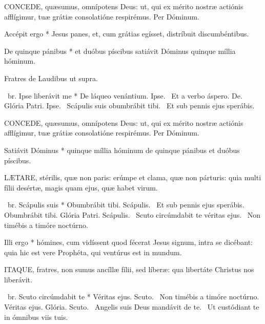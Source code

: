 
\lettrine[lines=2]{C}{ONCEDE}, quæsumus, omnípotens Deus: ut, qui ex mérito nostræ actiónis afflígimur, tuæ grátiæ consolatióne respirémus. Per Dóminum.


 Accépit ergo * Jesus panes, et, cum grátias egísset, distríbuit discumbéntibus.


 De quinque pánibus * et duóbus píscibus satiávit Dóminus quinque míllia hóminum.

 Fratres de Laudibus ut supra.

\R\ br. Ipse liberávit me * De láqueo venántium. Ipse. \V\ Et a verbo áspero. De. Glória Patri. Ipse. \V\ Scápulis suis obumbrábit tibi. \R\ Et sub pennis ejus sperábis.


\lettrine[lines=2]{C}{ONCEDE}, quæsumus, omnípotens Deus: ut, qui ex mérito nostræ actiónis afflígimur, tuæ grátiæ consolatióne respirémus. Per Dóminum.


 Satiávit Dóminus * quinque míllia hóminum de quinque pánibus et duóbus píscibus.


\lettrine[lines=2]{L}{ÆTARE}, stérilis, quæ non paris: erúmpe et clama, quæ non párturis: quia multi fílii desértæ, magis quam ejus, quæ habet virum.

\R\ br. Scápulis suis * Obumbrábit tibi. Scápulis. \V\ Et sub pennis ejus sperábis. Obumbrábit tibi. Glória Patri. Scápulis. \V\ Scuto circúmdabit te véritas ejus. \R\ Non timébis a timóre noctúrno.


 Illi ergo * hómines, cum vidíssent quod fécerat Jesus signum, intra se dicébant: quia hic est vere Prophéta, qui ventúrus est in mundum.


\lettrine[lines=2]{I}{TAQUE}, fratres, non sumus ancíllæ fílii, sed líberæ: qua libertáte Christus nos liberávit.

\R\ br. Scuto circúmdabit te * Véritas ejus. Scuto. \V\ Non timébis a timóre noctúrno. Véritas ejus. Glória. Scuto. \V\ Angelis suis Deus mandávit de te. \R\ Ut custódiant te in ómnibus viis tuis.

